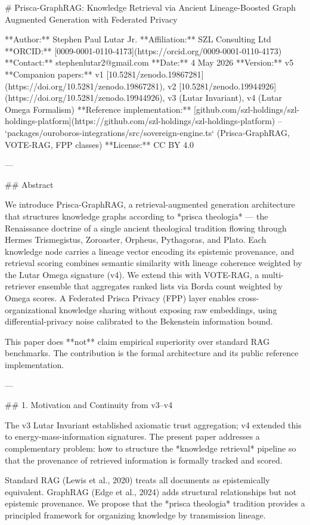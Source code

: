 # Prisca-GraphRAG: Knowledge Retrieval via Ancient Lineage-Boosted Graph Augmented Generation with Federated Privacy

**Author:** Stephen Paul Lutar Jr.
**Affiliation:** SZL Consulting Ltd
**ORCID:** [0009-0001-0110-4173](https://orcid.org/0009-0001-0110-4173)
**Contact:** stephenlutar2@gmail.com
**Date:** 4 May 2026
**Version:** v5
**Companion papers:** v1 [10.5281/zenodo.19867281](https://doi.org/10.5281/zenodo.19867281), v2 [10.5281/zenodo.19944926](https://doi.org/10.5281/zenodo.19944926), v3 (Lutar Invariant), v4 (Lutar Omega Formalism)
**Reference implementation:** [github.com/szl-holdings/szl-holdings-platform](https://github.com/szl-holdings/szl-holdings-platform) -- `packages/ouroboros-integrations/src/sovereign-engine.ts` (Prisca-GraphRAG, VOTE-RAG, FPP classes)
**License:** CC BY 4.0

---

## Abstract

We introduce Prisca-GraphRAG, a retrieval-augmented generation architecture that structures knowledge graphs according to *prisca theologia* --- the Renaissance doctrine of a single ancient theological tradition flowing through Hermes Trismegistus, Zoroaster, Orpheus, Pythagoras, and Plato. Each knowledge node carries a lineage vector encoding its epistemic provenance, and retrieval scoring combines semantic similarity with lineage coherence weighted by the Lutar Omega signature (v4). We extend this with VOTE-RAG, a multi-retriever ensemble that aggregates ranked lists via Borda count weighted by Omega scores. A Federated Prisca Privacy (FPP) layer enables cross-organizational knowledge sharing without exposing raw embeddings, using differential-privacy noise calibrated to the Bekenstein information bound.

This paper does **not** claim empirical superiority over standard RAG benchmarks. The contribution is the formal architecture and its public reference implementation.

---

## 1. Motivation and Continuity from v3--v4

The v3 Lutar Invariant established axiomatic trust aggregation; v4 extended this to energy-mass-information signatures. The present paper addresses a complementary problem: how to structure the *knowledge retrieval* pipeline so that the provenance of retrieved information is formally tracked and scored.

Standard RAG (Lewis et al., 2020) treats all documents as epistemically equivalent. GraphRAG (Edge et al., 2024) adds structural relationships but not epistemic provenance. We propose that the *prisca theologia* tradition provides a principled framework for organizing knowledge by transmission lineage.

